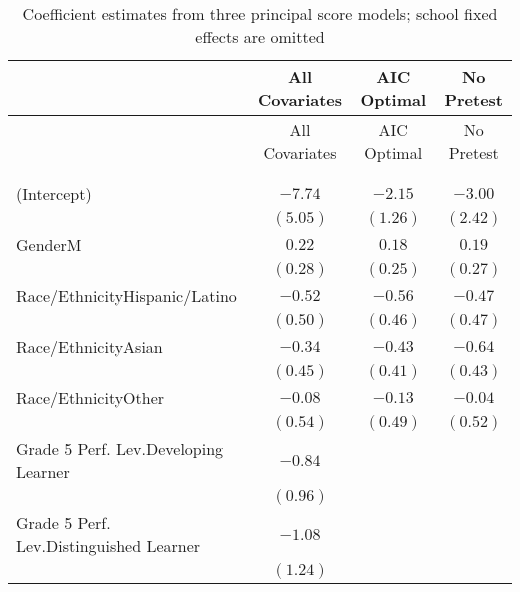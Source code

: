 

\begin{center}
\begin{longtable}{l c c c}
\hline
 & All Covariates & AIC Optimal & No Pretest \\
\hline
\endfirsthead
\hline
 & All Covariates & AIC Optimal & No Pretest \\
\hline
\endhead
\hline
\endfoot
\hline
\multicolumn{4}{l}{\scriptsize{$^{***}p<0.001$; $^{**}p<0.01$; $^{*}p<0.05$}}\\
\caption{Coefficient estimates from three principal score models; school fixed effects are omitted}
\label{tab:psTab}
\endlastfoot \\
(Intercept)                                        & $-7.74$      & $-2.15$       & $-3.00$      \\
                                                   & $(5.05)$     & $(1.26)$      & $(2.42)$     \\
GenderM                                            & $0.22$       & $0.18$        & $0.19$       \\
                                                   & $(0.28)$     & $(0.25)$      & $(0.27)$     \\
Race/EthnicityHispanic/Latino                             & $-0.52$      & $-0.56$       & $-0.47$      \\
                                                   & $(0.50)$     & $(0.46)$      & $(0.47)$     \\
Race/EthnicityAsian                                       & $-0.34$      & $-0.43$       & $-0.64$      \\
                                                   & $(0.45)$     & $(0.41)$      & $(0.43)$     \\
Race/EthnicityOther                                       & $-0.08$      & $-0.13$       & $-0.04$      \\
                                                   & $(0.54)$     & $(0.49)$      & $(0.52)$     \\
Grade 5 Perf. Lev.Developing Learner               & $-0.84$      &               &              \\
                                                   & $(0.96)$     &               &              \\
Grade 5 Perf. Lev.Distinguished Learner            & $-1.08$      &               &              \\
                                                   & $(1.24)$     &               &              \\

\end{longtable}
\end{center}
